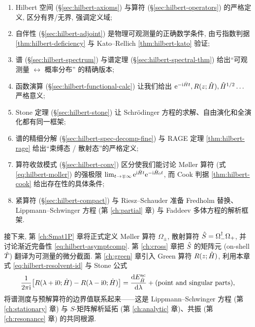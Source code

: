 \begin{enumerate}
    \item Hilbert 空间 (\S\ref{sec:hilbert-axioms}) 与算符 (\S\ref{sec:hilbert-operators}) 的严格定义, 区分有界/无界, 强调定义域;
    \item 自伴性 (\S\ref{sec:hilbert-adjoint}) 是物理可观测量的正确数学条件, 由亏指数判据 \ref{thm:hilbert-deficiency} 与 Kato--Rellich \ref{thm:hilbert-kato} 验证;
    \item 谱 (\S\ref{sec:hilbert-spectrum}) 与谱定理 (\S\ref{sec:hilbert-spectral-thm}) 给出``可观测量 $\leftrightarrow$ 概率分布'' 的精确版本;
    \item 函数演算 (\S\ref{sec:hilbert-functional-calc}) 让我们给出 $\mathrm{e}^{-\mathrm{i}\hat{H}t}, R(z;\hat{H}), \hat{H}^{1/2}\ldots$ 严格意义;
    \item Stone 定理 (\S\ref{sec:hilbert-stone}) 让 Schrödinger 方程的求解、自由演化和全演化都有同一框架;
    \item 谱的精细分解 (\S\ref{sec:hilbert-spec-decomp-fine}) 与 RAGE 定理 \ref{thm:hilbert-rage} 给出``束缚态 / 散射态''的严格定义;
    \item 算符收敛模式 (\S\ref{sec:hilbert-conv}) 区分使我们能讨论 Møller 算符 (式 \eqref{eq:hilbert-moller}) 的强极限 $\lim_{t\to\mp\infty}\mathrm{e}^{\mathrm{i}\hat{H}t}\mathrm{e}^{-\mathrm{i}\hat{H}_0 t}$, 而 Cook 判据 \ref{thm:hilbert-cook} 给出存在性的具体条件;
    \item 紧算符 (\S\ref{sec:hilbert-compact}) 与 Riesz--Schauder 准备 Fredholm 替换、Lippmann--Schwinger 方程 (第 \ref{ch:partial} 章) 与 Faddeev 多体方程的解析框架.
\end{enumerate}

接下来, 第 \ref{ch:Smat1P} 章将正式定义 Møller 算符 $\Omega_\pm$, 散射算符 $\hat{S}=\Omega_-^\dagger\Omega_+$, 并讨论渐近完备性 \eqref{eq:hilbert-asymptcomp}. 第 \ref{ch:cross} 章把 $\hat{S}$ 的矩阵元 (on-shell $\hat{T}$) 翻译为可测量的微分截面. 第 \ref{ch:green} 章引入 Green 算符 $R(z;\hat{H})$, 利用本章式 \eqref{eq:hilbert-resolvent-id} 与 Stone 公式
\begin{equation}\label{eq:hilbert-stone-formula}
\frac{1}{2\pi\mathrm{i}}\bigl[R(\lambda+\mathrm{i} 0;\hat{H})-R(\lambda-\mathrm{i} 0;\hat{H})\bigr]=\frac{\mathrm{d} E_{\hat{H}}^{\rm ac}}{\mathrm{d}\lambda}+(\text{point and singular parts}),
\end{equation}
将谱测度与预解算符的边界值联系起来——这是 Lippmann--Schwinger 方程 (第 \ref{ch:stationary} 章) 与 $S$-矩阵解析延拓 (第 \ref{ch:analytic} 章)、共振 (第 \ref{ch:resonance} 章) 的共同根源.

